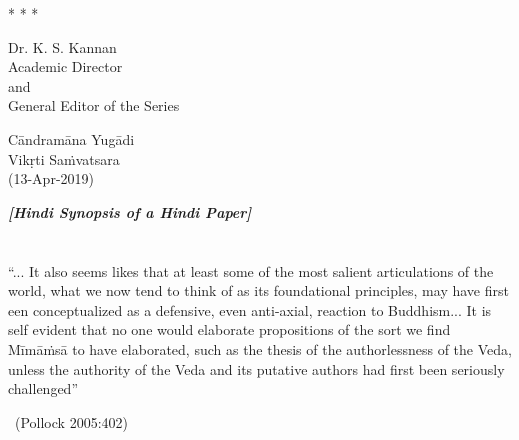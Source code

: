 \vskip 3pt

\begin{center}
* * *
\end{center}

\vskip 3pt

\begin{flushright}
Dr. K. S. Kannan\\ Academic Director\\ and\\ General Editor of the Series
\end{flushright}

Cāndramāna Yugādi\\ Vikṛti Saṁvatsara\\ (13-Apr-2019)

\begin{center}
\textbf{\textit{[Hindi Synopsis of a Hindi Paper]}}
\end{center}

\section*{}




\begin{myquote}
“... It also seems likes that at least some of the most salient articulations of the world, what we now tend to think of as its foundational principles, may have first een conceptualized as a defensive, even anti-axial, reaction to Buddhism... It is self evident that no one would elaborate propositions of the sort we find Mīmāṁsā to have elaborated, such as the thesis of the authorlessness of the Veda, unless the authority of the Veda and its putative authors had first been seriously challenged” 

~\hfill (Pollock 2005:402)
\end{myquote}

